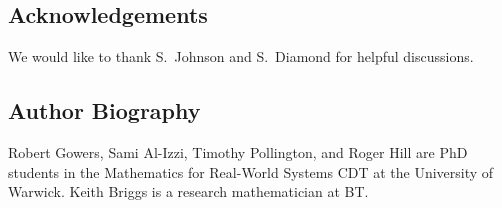 \documentclass[twocolumn,secnumarabic,amssymb, nobibnotes, aps, prl,superscriptaddress]{revtex4-1}
\begin{document}
\subsection*{Acknowledgements}
\noindent{}We would like to thank S.~Johnson and S.~Diamond for helpful discussions. 

\subsection*{Author Biography}
\noindent{}Robert Gowers, Sami Al-Izzi, Timothy Pollington, and Roger Hill are PhD students in the Mathematics for Real-World Systems CDT at the University of Warwick.  Keith Briggs is a research mathematician at BT.

\vspace{0.2cm}

 


\end{document}
